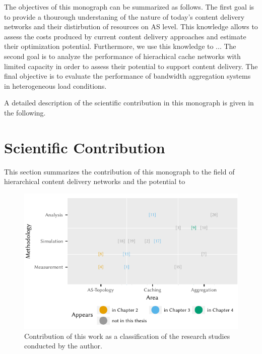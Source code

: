 The objectives of this monograph can be summarized as follows.
The first goal is to provide a thourough understaning of the nature of today's content delivery networks and their distirbution of resources on AS level.
This knowledge allows to assess the costs produced by current content delivery approaches and estimate their optimization potential.
Furthermore, we use this knowledge to ...
The second goal is to analyze the performance of hierachical cache networks with limited capacity in order to assess their potential to support content delivery.
The final objective is to evaluate the performance of bandwidth aggregation systems in heterogeneous load conditions.

A detailed description of the scientific contribution in this monograph is given in the following.

\newpage
\section{Scientific Contribution}\label{sec:introduction:scientific_contribution}

This section summarizes the contribution of this monograph to the field of hierarchical content delivery networks and the potential to

\begin{figure}
\centering
\includegraphics{figures/publications}
\caption{Contribution of this work as a classification of the research studies conducted by the author.}\label{fig:introduction:publications}
\end{figure}

